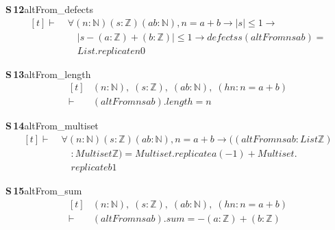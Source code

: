 \documentclass[conference]{IEEEtran}
\theoremstyle{definition}
\newcommand{\lean}[1]{\textsf{\footnotesize #1}}
\begin{document}
\noindent\textbf{S\,12}\quad\lean{altFrom\_defects}
{\footnotesize\[ \begin{aligned}[t]
\vdash\;&\forall (\mathit{n} : \mathbb{N} ) (\mathit{s} : \mathbb{Z} ) (\mathit{a} \mathit{b} : \mathbb{N} ), \mathit{n} = \mathit{a} + \mathit{b} \to |\mathit{s}| \leq 1 \to\\
&\quad |\mathit{s} - (\mathit{a}:\mathbb{Z} ) + (\mathit{b}:\mathbb{Z} )| \leq 1 \to \mathit{defects} \mathit{s} (\mathit{altFrom} \mathit{n} \mathit{s} \mathit{a} \mathit{b}) =\\
&\quad \mathit{List}.\mathit{replicate} \mathit{n} 0
\end{aligned} \]}

\noindent\textbf{S\,13}\quad\lean{altFrom\_length}
{\footnotesize\[ \begin{aligned}[t]
&(\mathit{n} : \mathbb{N} ),\; (\mathit{s} : \mathbb{Z} ),\; (\mathit{a} \mathit{b} : \mathbb{N} ),\; (\mathit{hn} : \mathit{n} = \mathit{a} + \mathit{b})\\
\vdash\;&(\mathit{altFrom} \mathit{n} \mathit{s} \mathit{a} \mathit{b}).\mathit{length} = \mathit{n}
\end{aligned} \]}

\noindent\textbf{S\,14}\quad\lean{altFrom\_multiset}
{\footnotesize\[ \begin{aligned}[t]
\vdash\;&\forall (\mathit{n} : \mathbb{N} ) (\mathit{s} : \mathbb{Z} ) (\mathit{a} \mathit{b} : \mathbb{N} ), \mathit{n} = \mathit{a} + \mathit{b} \to ((\mathit{altFrom} \mathit{n} \mathit{s} \mathit{a} \mathit{b} : \mathit{List} \mathbb{Z} )\\
&\quad : \mathit{Multiset} \mathbb{Z} ) = \mathit{Multiset}.\mathit{replicate} \mathit{a} (-1) + \mathit{Multiset}.\\
&\quad \mathit{replicate} \mathit{b} 1
\end{aligned} \]}

\noindent\textbf{S\,15}\quad\lean{altFrom\_sum}
{\footnotesize\[ \begin{aligned}[t]
&(\mathit{n} : \mathbb{N} ),\; (\mathit{s} : \mathbb{Z} ),\; (\mathit{a} \mathit{b} : \mathbb{N} ),\; (\mathit{hn} : \mathit{n} = \mathit{a} + \mathit{b})\\
\vdash\;&(\mathit{altFrom} \mathit{n} \mathit{s} \mathit{a} \mathit{b}).\mathit{sum} = -(\mathit{a}:\mathbb{Z} ) + (\mathit{b}:\mathbb{Z} )
\end{aligned} \]}
\end{document}
